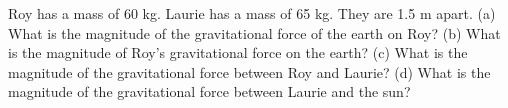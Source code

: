 Roy has a mass of 60 kg. Laurie has a mass of 65 kg.
They are 1.5 m apart.\hwendpart
(a) What is the magnitude of the gravitational force
of the earth on Roy?\hwendpart
(b) What is the magnitude of Roy's gravitational force on the earth?\hwendpart
(c) What is the magnitude of the gravitational force
between Roy and Laurie?\hwendpart
(d) What is the magnitude of the gravitational force
between Laurie and the sun?\answercheck
